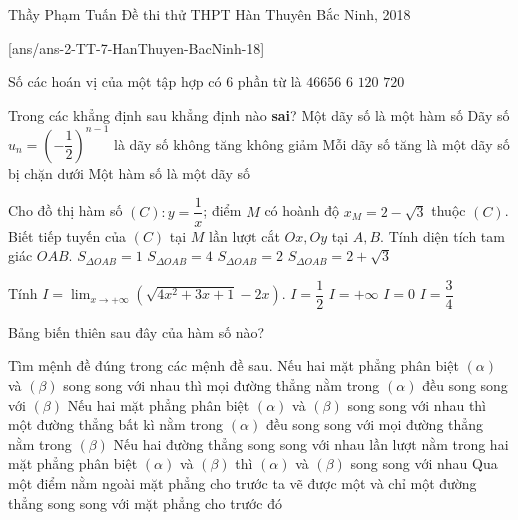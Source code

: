 
\begin{name}
{Thầy  Phạm Tuấn}
{Đề thi thử THPT Hàn Thuyên Bắc Ninh, 2018}
\end{name}
\noindent

[ans/ans-2-TT-7-HanThuyen-BacNinh-18]
\begin{ex}%
Số các hoán vị của một tập hợp có $6$ phần từ là
\choice
{$46656$}
{$6$}
{$120$}
{\True  $720$}
\end{ex}

\begin{ex}%
Trong các khẳng định sau khẳng định nào \textbf{sai}?
\choice
{Một dãy số là một hàm số}
{Dãy số $u_n = \left (-\dfrac{1}{2}\right )^{n-1}$ là dãy số không tăng không giảm}
{Mỗi dãy số tăng là một dãy số bị chặn dưới}
{\True Một hàm số là một dãy số}
\end{ex}

\begin{ex}%
Cho đồ thị hàm số $(C) : y=\dfrac{1}{x}$; điểm $M$ có hoành độ $x_M = 2-\sqrt{3}$ thuộc $(C)$. Biết tiếp tuyến của $(C)$ tại $M$ lần lượt cắt $Ox,Oy$ tại $A,B$. Tính diện tích tam giác $OAB$. 
\choice
{$S_{\Delta OAB} =1$}
{$S_{\Delta OAB} =4$}
{\True $S_{\Delta OAB} =2$}
{$S_{\Delta OAB} =2+\sqrt{3}$}
\end{ex}

\begin{ex}%
Tính $\displaystyle  I=\lim_{x \to +\infty} \left  (\sqrt{4x^2+3x+1} - 2x\right )$.
\choice
{$I=\dfrac{1}{2}$}
{$I=+\infty$}
{$I=0$}
{\True $I=\dfrac{3}{4}$}
\end{ex}


\begin{ex}%
Bảng biến thiên sau đây của hàm số nào?
{
}
\end{ex}

\begin{ex}%
Tìm mệnh đề đúng trong các mệnh đề sau.
\choice
{\True Nếu hai mặt phẳng phân biệt $(\alpha)$ và $(\beta)$ song song với nhau thì mọi đường thẳng nằm trong $(\alpha)$
đều song song với $(\beta)$} 
{Nếu hai mặt phẳng phân biệt $(\alpha)$ và $(\beta)$ song song với nhau thì một đường thẳng bất kì  nằm trong $(\alpha)$ đều song song với mọi đường thẳng nằm trong $(\beta)$} 
{Nếu hai đường thẳng song song với nhau lần lượt nằm trong hai mặt phẳng phân biệt $(\alpha)$ và $(\beta)$ thì $(\alpha)$ và $(\beta)$ song song với nhau}
{Qua một điểm nằm ngoài mặt phẳng cho trước ta vẽ được một và chỉ một đường thẳng song song với mặt phẳng cho trước đó}
\end{ex}


